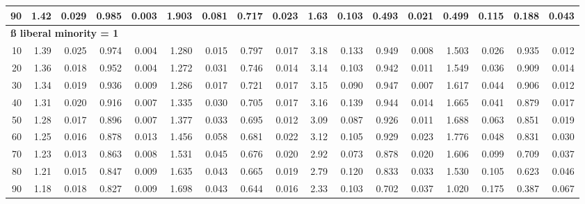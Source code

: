 \documentclass[
]{article}
\begin{document}
\begin{table}[H]
{\begin{tabular}{r|r|r|r|r|r|r|r|r|r|r|r|r|r|r|r|r}
\hline
\hspace{1em}90 & 1.42 & 0.029 & 0.985 & 0.003 & 1.903 & 0.081 & 0.717 & 0.023 & 1.63 & 0.103 & 0.493 & 0.021 & 0.499 & 0.115 & 0.188 & 0.043\\
\hline
\multicolumn{17}{l}{\textbf{ß liberal minority = 1}}\\
\hline
\hspace{1em}10 & 1.39 & 0.025 & 0.974 & 0.004 & 1.280 & 0.015 & 0.797 & 0.017 & 3.18 & 0.133 & 0.949 & 0.008 & 1.503 & 0.026 & 0.935 & 0.012\\
\hline
\hspace{1em}20 & 1.36 & 0.018 & 0.952 & 0.004 & 1.272 & 0.031 & 0.746 & 0.014 & 3.14 & 0.103 & 0.942 & 0.011 & 1.549 & 0.036 & 0.909 & 0.014\\
\hline
\hspace{1em}30 & 1.34 & 0.019 & 0.936 & 0.009 & 1.286 & 0.017 & 0.721 & 0.017 & 3.15 & 0.090 & 0.947 & 0.007 & 1.617 & 0.044 & 0.906 & 0.012\\
\hline
\hspace{1em}40 & 1.31 & 0.020 & 0.916 & 0.007 & 1.335 & 0.030 & 0.705 & 0.017 & 3.16 & 0.139 & 0.944 & 0.014 & 1.665 & 0.041 & 0.879 & 0.017\\
\hline
\hspace{1em}50 & 1.28 & 0.017 & 0.896 & 0.007 & 1.377 & 0.033 & 0.695 & 0.012 & 3.09 & 0.087 & 0.926 & 0.011 & 1.688 & 0.063 & 0.851 & 0.019\\
\hline
\hspace{1em}60 & 1.25 & 0.016 & 0.878 & 0.013 & 1.456 & 0.058 & 0.681 & 0.022 & 3.12 & 0.105 & 0.929 & 0.023 & 1.776 & 0.048 & 0.831 & 0.030\\
\hline
\hspace{1em}70 & 1.23 & 0.013 & 0.863 & 0.008 & 1.531 & 0.045 & 0.676 & 0.020 & 2.92 & 0.073 & 0.878 & 0.020 & 1.606 & 0.099 & 0.709 & 0.037\\
\hline
\hspace{1em}80 & 1.21 & 0.015 & 0.847 & 0.009 & 1.635 & 0.043 & 0.665 & 0.019 & 2.79 & 0.120 & 0.833 & 0.033 & 1.530 & 0.105 & 0.623 & 0.046\\
\hline
\hspace{1em}90 & 1.18 & 0.018 & 0.827 & 0.009 & 1.698 & 0.043 & 0.644 & 0.016 & 2.33 & 0.103 & 0.702 & 0.037 & 1.020 & 0.175 & 0.387 & 0.067\\
\hline
\end{tabular}}\begin{table}
\centering
{}
\end{table}
\end{table}
\end{document}
